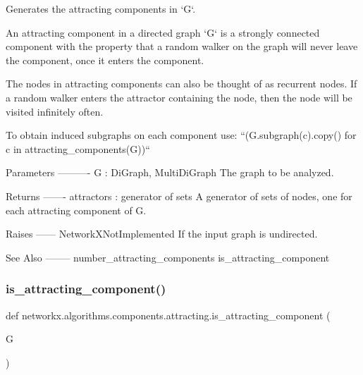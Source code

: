 \begin{DoxyVerb}Generates the attracting components in `G`.

An attracting component in a directed graph `G` is a strongly connected
component with the property that a random walker on the graph will never
leave the component, once it enters the component.

The nodes in attracting components can also be thought of as recurrent
nodes.  If a random walker enters the attractor containing the node, then
the node will be visited infinitely often.

To obtain induced subgraphs on each component use:
``(G.subgraph(c).copy() for c in attracting_components(G))``

Parameters
----------
G : DiGraph, MultiDiGraph
    The graph to be analyzed.

Returns
-------
attractors : generator of sets
    A generator of sets of nodes, one for each attracting component of G.

Raises
------
NetworkXNotImplemented
    If the input graph is undirected.

See Also
--------
number_attracting_components
is_attracting_component\end{DoxyVerb}
 \mbox{\label{namespacenetworkx_1_1algorithms_1_1components_1_1attracting_a0fa6754e8f2554b88b948fea54b82b15}} 
\subsubsection{\texorpdfstring{is\+\_\+attracting\+\_\+component()}{is\_attracting\_component()}}
{\footnotesize\ttfamily def networkx.\+algorithms.\+components.\+attracting.\+is\+\_\+attracting\+\_\+component (\begin{DoxyParamCaption}\item[{}]{G }\end{DoxyParamCaption})}

